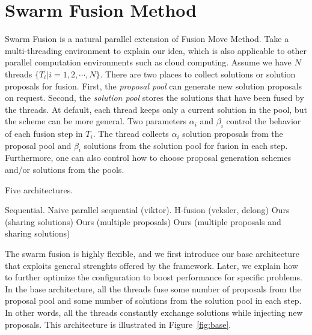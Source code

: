 \section{Swarm Fusion Method}
  Swarm Fusion is a natural
parallel extension of Fusion Move Method. Take a multi-threading
environment to explain our idea, which is also applicable to other
parallel computation environments such as cloud computing. Assume we
have $N$ threads $\{T_i | i=1, 2, \cdots, N\}$. There are two places to
collect solutions or solution proposals for fusion. First, the {\it
proposal pool} can generate new solution proposals on request.
%
Second, the {\it solution pool} stores the solutions that have been
fused by the threads. At default, each thread keeps only a current
solution in the pool, but the scheme can be more general. Two
parameters $\alpha_i$ and $\beta_i$ control the behavior of each fusion
step in $T_i$. The thread collects $\alpha_i$ solution proposals
from the proposal pool and $\beta_i$ solutions from the solution pool
for fusion in each step.
%
Furthermore, one can also control how to choose proposal generation
schemes and/or solutions from the pools.



Five architectures.

Sequential.
Naive parallel sequential (viktor).
H-fusion (veksler, delong)
Ours (sharing solutions)
Ours (multiple proposals)
Ours (multiple proposals and sharing solutions)





The swarm fusion is highly flexible, and we first introduce our base
architecture that exploits general strenghts offered by the
framework. Later, we explain how to further optimize the configuration
to boost performance for specific problems. In the base architecture,
all the threads fuse some number of proposals from the proposal pool and
some number of solutions from the solution pool in each step. In other
words, all the threads constantly exchange solutions while injecting new
proposals. This architecture is illustrated in Figure~\ref{fig:base}.

